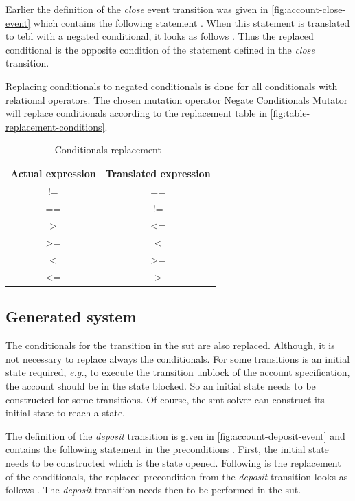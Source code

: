 Earlier the definition of the \textit{close} event transition was given in
\autoref{fig:account-close-event} which contains the following statement
. When this statement is translated to tebl
with a negated conditional, it looks as follows
. Thus the replaced conditional is the opposite
condition of the statement defined in the \textit{close} transition.

Replacing conditionals to negated conditionals is done for all conditionals with
relational operators. The chosen mutation operator Negate Conditionals Mutator
will replace conditionals according to the replacement table in
\autoref{fig:table-replacement-conditions}.

\begin{table}[h!]
\centering
\begin{tabular}{cc}
\toprule
\textbf{Actual expression} & \textbf{Translated expression} \\ \midrule
!=                         & ==                             \\
==                         & !=                             \\
\textgreater               & \textless=                     \\
\textgreater=              & \textless                      \\
\textless                  & \textgreater=                  \\
\textless=                 & \textgreater                   \\ \bottomrule
\end{tabular}
\caption{Conditionals replacement~\cite{pitmutators}}\label{fig:table-replacement-conditions}
\end{table}
\FloatBarrier

\subsection{Generated system}
The conditionals for the transition in the \gls{sut} are also replaced.
Although, it is not necessary to replace always the conditionals. For some
transitions is an initial state required, \textit{e.g.}, to execute the transition unblock
of the account specification, the account should be in the state blocked. So an
initial state needs to be constructed for some transitions. Of course, the \gls{smt}
solver can construct its initial state to reach a state.

The definition of the \textit{deposit} transition is given in
\autoref{fig:account-deposit-event} and contains the following statement in the
preconditions . First, the initial state needs to be
constructed which is the state opened. Following is the replacement of the conditionals, the
replaced precondition from the \textit{deposit} transition looks as follows
. The \textit{deposit} transition needs then to be
performed in the \gls{sut}.

